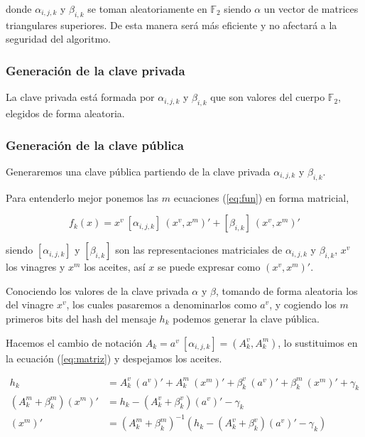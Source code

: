 donde $\alpha_{i,j,k}$ y $\beta_{i,k}$ se toman aleatoriamente en $\mathds{F}_2$ siendo $\alpha$ un vector de matrices triangulares superiores. De esta manera será más eficiente y no afectará a la seguridad del algoritmo.



\subsubsection{Generación de la clave privada}
La clave privada está formada por $\alpha_{i,j,k}$ y $\beta_{i,k}$ que son valores del cuerpo $\mathds{F}_2$, elegidos de forma aleatoria.


\subsubsection{Generación de la clave pública}
Generaremos una clave pública partiendo de la clave privada $\alpha_{i,j,k}$ y $\beta_{i,k}$.

Para entenderlo mejor ponemos las $m$ ecuaciones (\ref{eq:fun}) en forma matricial,

\begin{equation}\label{eq:matriz} 
f_k(x) = x^v\ [\alpha_{i,j,k}]\ (x^v, x^m)' + [\beta_{i,k}]\ (x^v, x^m)'
\end{equation}

siendo $[\alpha_{i,j,k}]$ y $[\beta_{i,k}]$ son las representaciones matriciales de $\alpha_{i,j,k}$ y $\beta_{i,k}$, $x^v$ los vinagres y $x^m$ los aceites, así $x$ se puede expresar como $(x^v, x^m)'$.

Conociendo los valores de la clave privada $\alpha$ y $\beta$, tomando de forma aleatoria los del vinagre $x^v$, los cuales pasaremos a denominarlos como $a^v$, y cogiendo los $m$ primeros bits del hash del mensaje $h_k$ podemos generar la clave pública.

Hacemos el cambio de notación $A_k = a^v\ [\alpha_{i,j,k}] = (A^v_k, A^m_k)$,  lo sustituimos en la ecuación (\ref{eq:matriz}) y despejamos los aceites.

\begin{align}
h_k &= A_k^v\ (a^v)' +  A_k^m\ (x^m)' + \beta_k^v\ (a^v)' + \beta_k^m\ (x^m)' + \gamma_k\\
(A_k^m + \beta_k^m) (x^m)' &= h_k - (A_k^v + \beta_k^v) (a^v)' -\gamma_k\\
\label{eq:despeje}
(x^m)' &= (A_k^m + \beta_k^m)^{-1} (h_k - (A_k^v + \beta_k^v) (a^v)' -\gamma_k)
\end{align}

